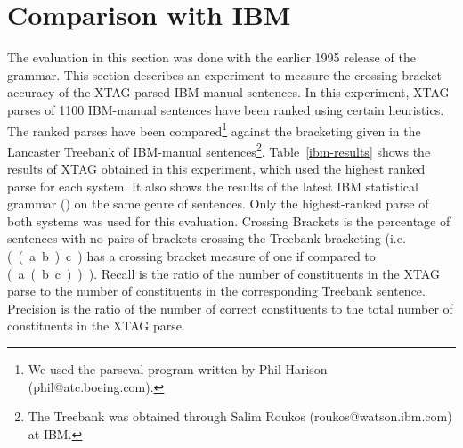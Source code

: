 




\section{Comparison with IBM}

The evaluation in this section was done with the earlier 1995 release
of the grammar. This section describes an experiment to measure the
crossing bracket accuracy of the XTAG-parsed IBM-manual sentences.  In
this experiment, XTAG parses of 1100 IBM-manual sentences have been
ranked using certain heuristics. The ranked parses have been
compared\footnote{We used the parseval program written by Phil Harison
  (phil@atc.boeing.com).}  against the bracketing given in the
Lancaster Treebank of IBM-manual sentences\footnote{The Treebank was
  obtained through Salim Roukos (roukos@watson.ibm.com) at IBM.}.
Table~\ref{ibm-results} shows the results of XTAG obtained in this
experiment, which used the highest ranked parse for each system. It
also shows the results of the latest IBM statistical grammar
(\cite{jelineketal94}) on the same genre of sentences. Only the
highest-ranked parse of both systems was used for this evaluation.
Crossing Brackets is the percentage of sentences with no pairs of
brackets crossing the Treebank bracketing (i.e.  (~(~a~b~)~c~) has a
crossing bracket measure of one if compared to (~a~(~b~c~)~)~). Recall
is the ratio of the number of constituents in the XTAG parse to the
number of constituents in the corresponding Treebank sentence.
Precision is the ratio of the number of correct constituents to the
total number of constituents in the XTAG parse.

